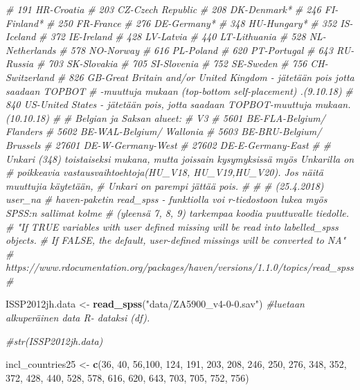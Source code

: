 \documentclass[
  finnish,
]{book}
\newenvironment{Shaded}{\begin{snugshade}}{\end{snugshade}}
\newcommand{\CommentTok}[1]{\textcolor[rgb]{0.56,0.35,0.01}{\textit{#1}}}
\newcommand{\DecValTok}[1]{\textcolor[rgb]{0.00,0.00,0.81}{#1}}
\newcommand{\KeywordTok}[1]{\textcolor[rgb]{0.13,0.29,0.53}{\textbf{#1}}}
\newcommand{\NormalTok}[1]{#1}
\newcommand{\StringTok}[1]{\textcolor[rgb]{0.31,0.60,0.02}{#1}}
\begin{document}
\begin{Shaded}
\begin{Highlighting}[]
\CommentTok{# 191 HR-Croatia}
\CommentTok{# 203 CZ-Czech Republic}
\CommentTok{# 208 DK-Denmark*}
\CommentTok{# 246 FI-Finland*}
\CommentTok{# 250 FR-France}
\CommentTok{# 276 DE-Germany*}
\CommentTok{# 348 HU-Hungary*}
\CommentTok{# 352 IS-Iceland}
\CommentTok{# 372 IE-Ireland}
\CommentTok{# 428 LV-Latvia}
\CommentTok{# 440 LT-Lithuania}
\CommentTok{# 528 NL-Netherlands}
\CommentTok{# 578 NO-Norway}
\CommentTok{# 616 PL-Poland}
\CommentTok{# 620 PT-Portugal}
\CommentTok{# 643 RU-Russia}
\CommentTok{# 703 SK-Slovakia}
\CommentTok{# 705 SI-Slovenia}
\CommentTok{# 752 SE-Sweden}
\CommentTok{# 756 CH-Switzerland}
\CommentTok{# 826 GB-Great Britain and/or United Kingdom - jätetään pois jotta saadaan TOPBOT }
\CommentTok{#                          -muuttuja mukaan (top-bottom self-placement) .(9.10.18)}
\CommentTok{# 840 US-United States - jätetään pois, jotta saadaan TOPBOT-muuttuja mukaan.(10.10.18)}
\CommentTok{#}
\CommentTok{# Belgian ja Saksan alueet:}
\CommentTok{#  V3}
\CommentTok{#  5601     BE-FLA-Belgium/ Flanders}
\CommentTok{#  5602     BE-WAL-Belgium/ Wallonia}
\CommentTok{#  5603     BE-BRU-Belgium/ Brussels}
\CommentTok{# 27601     DE-W-Germany-West}
\CommentTok{# 27602     DE-E-Germany-East}
\CommentTok{#}
\CommentTok{# Unkari (348) toistaiseksi mukana, mutta joissain kysymyksissä myös Unkarilla on }
\CommentTok{# poikkeavia vastausvaihtoehtoja(HU_V18, HU_V19,HU_V20). Jos näitä muuttujia käytetään, }
\CommentTok{# Unkari on parempi jättää pois. }
\CommentTok{# }
\CommentTok{#}
\CommentTok{# (25.4.2018) user_na  }
\CommentTok{# haven-paketin read_spss - funktiolla voi r-tiedostoon lukea myös SPSS:n sallimat kolme }
\CommentTok{# (yleensä 7, 8, 9) tarkempaa koodia puuttuvalle tiedolle.}
\CommentTok{# "If TRUE variables with user defined missing will be read into labelled_spss objects. }
\CommentTok{# If FALSE, the default, user-defined missings will be converted to NA"}
\CommentTok{# https://www.rdocumentation.org/packages/haven/versions/1.1.0/topics/read_spss}
\CommentTok{#}
 
\NormalTok{ISSP2012jh.data <-}\StringTok{ }\KeywordTok{read_spss}\NormalTok{(}\StringTok{"data/ZA5900_v4-0-0.sav"}\NormalTok{) }\CommentTok{#luetaan alkuperäinen data R- dataksi (df).}

\CommentTok{#str(ISSP2012jh.data)}

\NormalTok{incl_countries25 <-}\StringTok{ }\KeywordTok{c}\NormalTok{(}\DecValTok{36}\NormalTok{, }\DecValTok{40}\NormalTok{, }\DecValTok{56}\NormalTok{,}\DecValTok{100}\NormalTok{, }\DecValTok{124}\NormalTok{, }\DecValTok{191}\NormalTok{, }\DecValTok{203}\NormalTok{, }\DecValTok{208}\NormalTok{, }\DecValTok{246}\NormalTok{, }\DecValTok{250}\NormalTok{, }\DecValTok{276}\NormalTok{, }\DecValTok{348}\NormalTok{, }\DecValTok{352}\NormalTok{, }
                      \DecValTok{372}\NormalTok{, }\DecValTok{428}\NormalTok{, }\DecValTok{440}\NormalTok{, }\DecValTok{528}\NormalTok{, }\DecValTok{578}\NormalTok{, }\DecValTok{616}\NormalTok{, }\DecValTok{620}\NormalTok{, }\DecValTok{643}\NormalTok{, }\DecValTok{703}\NormalTok{, }\DecValTok{705}\NormalTok{, }\DecValTok{752}\NormalTok{, }\DecValTok{756}\NormalTok{)}


\end{Highlighting}
\end{Shaded}
\end{document}
